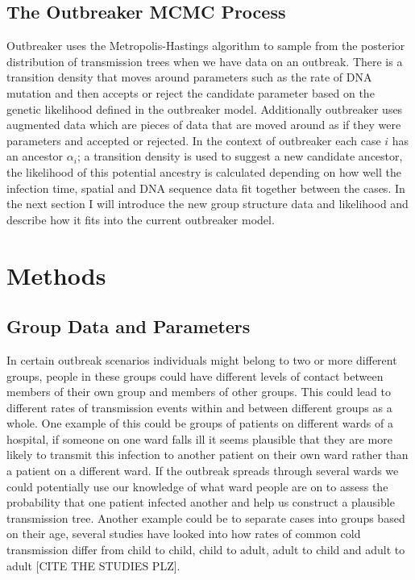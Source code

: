 \documentclass{amsbook}
\begin{document}
\section{The Outbreaker MCMC Process}
Outbreaker uses the Metropolis-Hastings algorithm to sample from the posterior distribution of transmission trees when we have data on an outbreak. There is a transition density that moves around parameters such as the rate of DNA mutation and then accepts or reject the candidate parameter based on the genetic likelihood defined in the outbreaker model. Additionally outbreaker uses augmented data which are pieces of data that are moved around as if they were parameters and accepted or rejected. In the context of outbreaker each case $i$ has an ancestor $\alpha_i$; a transition density is used to suggest a new candidate ancestor, the likelihood of this potential ancestry is calculated depending on how well the infection time, spatial and DNA sequence data fit together between the cases. In the next section I will introduce the new group structure data and likelihood and describe how it fits into the current outbreaker model.


\chapter{Methods}
\section{Group Data and Parameters}
In certain outbreak scenarios individuals might belong to two or more different groups, people in these groups could have different levels of contact between members of their own group and members of other groups. This could lead to different rates of transmission events within and between different groups as a whole. One example of this could be groups of patients on different wards of a hospital, if someone on one ward falls ill it seems plausible that they are more likely to transmit this infection to another patient on their own ward rather than a patient on a different ward. If the outbreak spreads through several wards we could potentially use our knowledge of what ward people are on to assess the probability that one patient infected another and help us construct a plausible transmission tree. Another example could be to separate cases into groups based on their age, several studies have looked into how rates of common cold transmission differ from child to child, child to adult, adult to child and adult to adult [CITE THE STUDIES PLZ].
\end{document}
